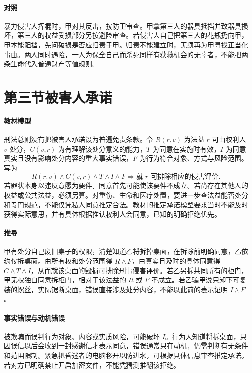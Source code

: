 \paragraph{对照}
暴力侵害人挥棍时，甲对其反击，按防卫审查。甲拿第三人的器具抵挡并致器具损坏，第三人的权益受损部分另按避险审查。若侵害人自己把第三人的花瓶扔向甲，甲本能阻挡，先问破损是否应归责于甲。归责不能建立时，无须再为甲寻找正当化事由。两人同时遇险，一人为保全自己而杀死同样有获救机会的无辜者，不能把两条生命代入普通财产等值规则。

\section{第三节\quad 被害人承诺}

\paragraph{教材模型}
刑法总则没有把被害人承诺设为普遍免责条款。令 \(R(r,v)\) 为法益 \(r\) 可由权利人 \(v\) 处分，\(C(v,r)\) 为有理解该处分意义的能力，\(T\) 为同意在实施时有效，\(I\) 为同意真实且没有影响处分内容的重大事实错误，\(F\) 为行为符合对象、方式与风险范围。写为
\[
R(r,v)\land C(v,r)\land T\land I\land F
\Longrightarrow \text{就 }r\text{ 可排除相应的侵害评价}.
\]
若罪状本身以违反意愿为要件，同意首先可能使该要件不成立。若尚存在其他人的权益或公共法益，必须另算。对重伤、生命和医疗处置，要进一步查法益能否处分和专门规范，不能仅凭私人同意推定合法。教材的推定承诺模型要求当时不能及时获得实际意思，并有具体根据推认权利人会同意，已知的明确拒绝优先。

\paragraph{推导}
甲有处分自己废旧桌子的权限，清楚知道乙将拆掉桌面，在拆除前明确同意，乙依约仅拆桌面。由所有权和处分范围得 \(R\land F\)，由真实且及时的具体同意得 \(C\land T\land I\)，从而就该桌面的毁损可排除刑事侵害评价。若乙另拆共同所有的柜门，甲无权独自同意拆柜门，相对于该法益的 \(R\) 或 \(F\) 不成立。若乙骗甲说只卸下可复装的螺丝，实际锯断桌面，错误直接涉及处分内容，不能以此前的表示证明 \(I\land F\)。

\paragraph{事实错误与动机错误}
被欺骗而误判行为对象、内容或实质风险，可能破坏 \(I\)。行为人知道将拆桌面，只因误信以后会收到一封感谢信才表示同意，错误通常只在动机，仍需判断有无条件和范围限制。紧急把昏迷者的电脑移开以防进水，可根据具体信息审查推定承诺。若对方已明确禁止开启加密文件，不能凭猜测推翻该拒绝。

